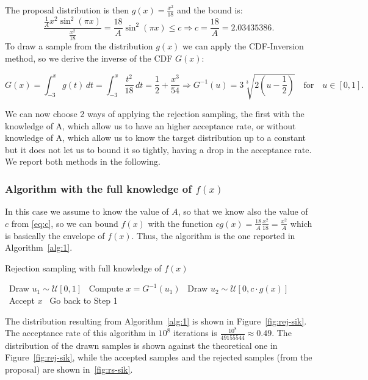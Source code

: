 \documentclass[a4paper]{article}
\begin{document}
\noindent
The proposal distribution is then $g(x) = \frac{x^2}{18}$ and the bound is:
\begin{equation}
  \label{eq:c}
  \frac{\frac{1}{A}x^2\sin^2(\pi x)}{\frac{x^2}{18}} =
  \frac{18}{A}\sin^2(\pi x) \leq c \Rightarrow c = \frac{18}{A} = 2.03435386.
\end{equation}
To draw a sample from the distribution $g(x)$ we can apply the
CDF-Inversion method, so we derive the inverse of the CDF $G(x)$:

\begin{equation*}
  G(x) = \int_{-3}^{x}g(t)\,dt = \int_{-3}^{x} \frac{t^2}{18}\,dt =
  \frac{1}{2}+\frac{x^3}{54}
  \Rightarrow G^{-1}(u) = 3\sqrt[3]{2(u-\frac{1}{2})} \quad
  \text{for}\quad u \in [0,1].
\end{equation*}

We can now choose 2 ways of applying the rejection sampling, the
first with the knowledge of A, which allow us to have an higher
acceptance rate, or without knowledge of A, which allow us to know
the target distribution up to a constant but it does not let us to
bound it so tightly, having a drop in the acceptance rate. We report
both methods in the following.

\subsubsection*{Algorithm with the full knowledge of $f(x)$}
In this case we assume to know the value of $A$, so that we know also
the value of $c$ from \eqref{eq:c}, so we can bound $f(x)$ with the
function $cg(x) = \frac{18}{A}\frac{x^2}{18} =\frac{x^2}{A}$ which is
basically the envelope of $f(x)$.
Thus, the algorithm is the one reported in Algorithm~\ref{alg:1}.

\begin{algorithm}
  \caption{Rejection sampling with full knowledge of $f(x)$}\label{alg:1}
  \begin{algorithmic}[1]
    \STATE~Draw $u_1 \sim \mathcal{U}[0,1]$
    \STATE~Compute $x = G^{-1}(u_1)$
    \STATE~Draw $u_2 \sim \mathcal{U}[0, c \cdot g(x)]$
    \STATE~Accept $x$
    \ELSE%
    \STATE~Go back to Step 1
    \ENDIF%
  \end{algorithmic}
\end{algorithm}

The distribution resulting from Algorithm~\ref{alg:1} is shown in
Figure~\ref{fig:rej-sik}. The acceptance rate of this algorithm in
$10^8$ iterations is $\frac{10^8}{49155544} \approx 0.49$. The
distribution of the drawn samples is shown against the theoretical
one in Figure~\ref{fig:rej-sik}, while the accepted samples and the
rejected samples (from the proposal) are shown in~\ref{fig:rs-sik}.
\end{document}
